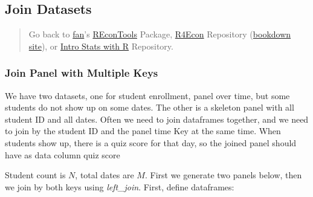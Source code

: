 \documentclass[
]{book}
\newenvironment{Shaded}{\begin{snugshade}}{\end{snugshade}}
\newcommand{\CommentTok}[1]{\textcolor[rgb]{0.56,0.35,0.01}{\textit{#1}}}
\newcommand{\DataTypeTok}[1]{\textcolor[rgb]{0.13,0.29,0.53}{#1}}
\newcommand{\DecValTok}[1]{\textcolor[rgb]{0.00,0.00,0.81}{#1}}
\newcommand{\ErrorTok}[1]{\textcolor[rgb]{0.64,0.00,0.00}{\textbf{#1}}}
\newcommand{\KeywordTok}[1]{\textcolor[rgb]{0.13,0.29,0.53}{\textbf{#1}}}
\newcommand{\NormalTok}[1]{#1}
\newcommand{\OperatorTok}[1]{\textcolor[rgb]{0.81,0.36,0.00}{\textbf{#1}}}
\newcommand{\StringTok}[1]{\textcolor[rgb]{0.31,0.60,0.02}{#1}}
\begin{document}
\hypertarget{join-datasets}{%
\subsection{Join Datasets}\label{join-datasets}}

\begin{quote}
Go back to \href{http://fanwangecon.github.io/CodeDynaAsset/}{fan}'s \href{https://fanwangecon.github.io/REconTools/}{REconTools} Package, \href{https://fanwangecon.github.io/R4Econ/}{R4Econ} Repository (\href{https://fanwangecon.github.io/R4Econ/bookdown}{bookdown site}), or \href{https://fanwangecon.github.io/Stat4Econ/}{Intro Stats with R} Repository.
\end{quote}

\hypertarget{join-panel-with-multiple-keys}{%
\subsubsection{Join Panel with Multiple Keys}\label{join-panel-with-multiple-keys}}

We have two datasets, one for student enrollment, panel over time, but some students do not show up on some dates. The other is a skeleton panel with all student ID and all dates. Often we need to join dataframes together, and we need to join by the student ID and the panel time Key at the same time. When students show up, there is a quiz score for that day, so the joined panel should have as data column quiz score

Student count is \(N\), total dates are \(M\). First we generate two panels below, then we join by both keys using \emph{left\_join}. First, define dataframes:

\begin{Shaded}
\end{Shaded}
\end{document}
